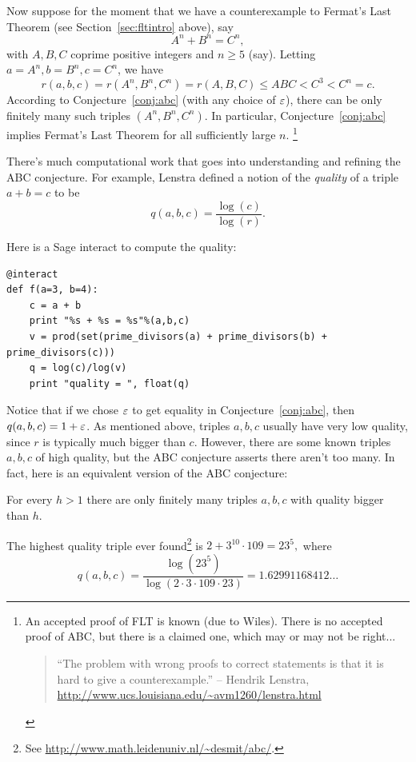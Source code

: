 \documentclass{book}
\begin{document}
Now suppose for the moment that we have a counterexample
to Fermat's Last Theorem (see Section~\ref{sec:fltintro} above),
say
$$
 A^n + B^n = C^n,
$$
with $A,B,C$ coprime positive integers and $n\ge 5$ (say).
Letting $a=A^n, b=B^n, c=C^n$, we have
$$
r(a,b,c) = r(A^n,B^n,C^n) = r(A,B,C) \leq ABC <C^3 < C^n=c.
$$
According to Conjecture~\ref{conj:abc} (with
any choice of $\varepsilon$), there can be only finitely many such
triples $(A^n, B^n, C^n)$.  In particular, Conjecture~\ref{conj:abc} implies
Fermat's Last Theorem for all sufficiently large $n$.
\footnote{An accepted proof of FLT is known (due to Wiles). There
is no accepted proof of ABC, but there is a claimed one,
which may or may not be right...
\begin{quote}
``The problem with wrong proofs to correct statements is that it is hard to give a counterexample.'' -- Hendrik Lenstra, \url{http://www.ucs.louisiana.edu/~avm1260/lenstra.html}
\end{quote}}

There's much computational work that goes into understanding
and refining the ABC conjecture.  For example,
Lenstra defined a notion of the {\em quality} of
a triple $a+b=c$ to be
$$q(a,b,c) = \frac{\log(c)}{\log(r)}.$$

Here is a Sage interact to compute the quality:
\begin{lstlisting}
@interact
def f(a=3, b=4):
    c = a + b
    print "%s + %s = %s"%(a,b,c)
    v = prod(set(prime_divisors(a) + prime_divisors(b) + prime_divisors(c)))
    q = log(c)/log(v)
    print "quality = ", float(q)
\end{lstlisting}

Notice that if we chose $\varepsilon$ to get equality
in Conjecture~\ref{conj:abc}, then
$q(a,b,c) = 1+\varepsilon$.
As mentioned above, triples $a,b,c$ usually have
very low quality, since
$r$ is typically much bigger than $c$.
However, there are some known triples $a,b,c$ of
high quality, but the ABC conjecture asserts there aren't too
many.  In fact, here is an equivalent version of the ABC conjecture:
\begin{conjecture}
For every $h>1$ there are only finitely many triples
$a,b,c$ with quality bigger than $h$.
\end{conjecture}

The highest quality triple ever found\footnote{See \url{http://www.math.leidenuniv.nl/~desmit/abc/}.} is
$
   2 + 3^{10}\cdot 109 = 23^5,
$
where
$$
q(a,b,c) = \frac{\log(23^5)}{\log(2\cdot 3 \cdot 109 \cdot 23)}
    = 1.62991168412\ldots
$$
\end{document}
